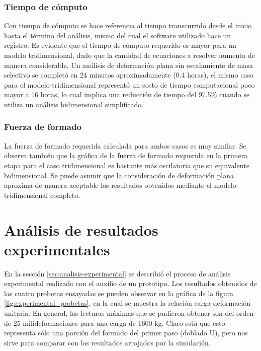 \subsubsection{Tiempo de cómputo}

Con tiempo de cómputo se hace referencia al tiempo transcurrido desde el inicio hasta el 
término del análisis, mismo del cual el software utilizado hace un registro. 
Es evidente que el tiempo de cómputo requerido es mayor para un modelo tridimensional, dado 
que la cantidad de ecuaciones a resolver aumenta de manera considerable.
Un análisis de deformación plana sin escalamiento de masa selectivo se completó en 24 minutos 
aproximadamente (0.4 horas), el mismo caso para el modelo tridimensional representó 
un costo de tiempo computacional poco mayor a 16 horas, lo cual implica una reducción de tiempo 
del 97.5\% cuando se utiliza un análisis bidimensional simplificado.

\subsubsection{Fuerza de formado}

La fuerza de formado requerida calculada para ambos casos es muy similar. Se observa también 
que la gráfica de la fuerza de formado requerida en la primera etapa para el caso tridimensional 
es bastante más oscilatoria que su equivalente bidimensional. 
Se puede asumir que la consideración de deformación plana aproxima de manera aceptable 
los resultados obtenidos mediante el modelo tridimensional completo.

\section{Análisis de resultados experimentales }

En la sección \ref{sec:analisis-experimental} se describió el proceso de análisis experimental 
realizado con el auxilio de un prototipo. Los resultados obtenidos de las cuatro probetas 
ensayadas se pueden observar en la gráfica de la figura \ref{fig:experimental_probetas}, en 
la cual se muestra la relación carga-deformación unitaria. 
En general, las lecturas máximas que se pudieron obtener son del orden de 25 milideformaciones 
para una carga de 1600 kg. Claro está que esto representa sólo una porción del formado del primer 
paso (doblado U), pero nos sirve para comparar con los resultados arrojados por la simulación.\\


